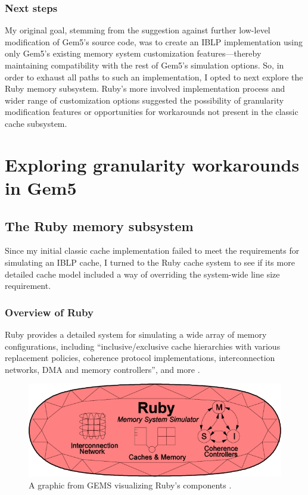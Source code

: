 \documentclass[12pt,twoside]{reedthesis}
\begin{document}
	\subsection*{Next steps}

	My original goal, stemming from the suggestion against further low-level modification of Gem5's source code, was to create an IBLP implementation using only Gem5's existing memory system customization features---thereby maintaining compatibility with the rest of Gem5's simulation options. So, in order to exhaust all paths to such an implementation, I opted to next explore the Ruby memory subsystem. Ruby's more involved implementation process and wider range of customization options suggested the possibility of granularity modification features or opportunities for workarounds not present in the classic cache subsystem.


\chapter{Exploring granularity workarounds in Gem5}

\section{The Ruby memory subsystem}

	Since my initial classic cache implementation failed to meet the requirements for simulating an IBLP cache, I turned to the Ruby cache system to see if its more detailed cache model included a way of overriding the system-wide line size requirement.

	\subsection*{Overview of Ruby}

	Ruby provides a detailed system for simulating a wide array of memory configurations, including ``inclusive/exclusive cache hierarchies with various replacement policies, coherence protocol implementations, interconnection networks, DMA and memory controllers'', and more \cite{gem5-ruby}.

	\begin{figure}[h]
		\centering
		\includegraphics[width=4.5in]{figures/ruby.jpg}
		\caption{A graphic from GEMS visualizing Ruby's components \cite{gem5-ruby}.}
	\end{figure}
\end{document}
